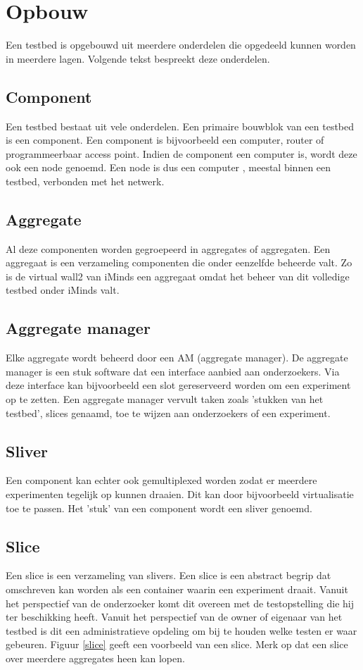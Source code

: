 \section{Opbouw}
Een testbed is opgebouwd uit meerdere onderdelen die opgedeeld kunnen worden in meerdere lagen. Volgende tekst bespreekt deze onderdelen.
\subsection{Component}
\npar
Een testbed bestaat uit vele onderdelen. Een primaire bouwblok van een testbed is een component. Een component is bijvoorbeeld een computer, router of programmeerbaar access point. Indien de component een computer is, wordt deze ook een node genoemd. Een node is dus een computer , meestal binnen een testbed, verbonden met het netwerk. 
\subsection{Aggregate}
\npar
Al deze componenten worden gegroepeerd in aggregates of aggregaten. Een aggregaat is een verzameling componenten die onder eenzelfde beheerde valt. Zo is de virtual wall2 van iMinds een aggregaat omdat het beheer van dit volledige testbed onder iMinds valt.
\clearpage
\subsection{Aggregate manager}
\npar
Elke aggregate wordt beheerd door een AM (aggregate manager). De aggregate manager is een stuk software dat een interface aanbied aan onderzoekers. Via deze interface kan bijvoorbeeld een slot gereserveerd worden om een experiment op te zetten. Een aggregate manager vervult taken zoals 'stukken van het testbed', slices genaamd, toe te wijzen aan onderzoekers of een experiment.
\subsection{Sliver}
\npar
Een component kan echter ook gemultiplexed worden zodat er meerdere experimenten tegelijk op kunnen draaien. Dit kan door bijvoorbeeld virtualisatie toe te passen. Het 'stuk' van een component wordt een sliver genoemd.
\subsection{Slice}
\npar
Een slice is een verzameling van slivers. Een slice is een abstract begrip dat omschreven kan worden als een container waarin een experiment draait. Vanuit het perspectief van de onderzoeker komt dit overeen met de testopstelling die hij ter beschikking heeft. Vanuit het perspectief van de owner of eigenaar van het testbed is dit een administratieve opdeling om bij te houden welke testen er waar gebeuren. Figuur \ref{slice} geeft een voorbeeld van een slice. Merk op dat een slice over meerdere aggregates heen kan lopen.
\clearpage
